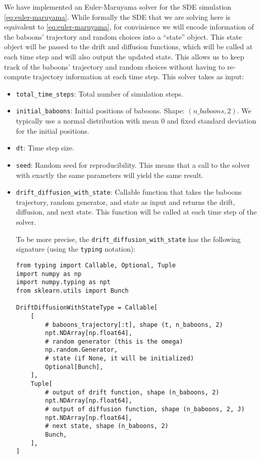 \documentclass[
    article,
    oneside,
]{memoir}
\begin{document}
We have implemented an Euler-Maruyama solver for the SDE simulation \eqref{eq:euler-maruyama}.
While formally the SDE that we are solving here is equivalent to \eqref{eq:euler-maruyama}, for convinience we will encode information of the baboons' trajectory and random choices into a ``state'' object. This state object will be passed to the drift and diffusion functions, which will be called at each time step and will also output the updated state. This allows us to keep
track of the baboons' trajectory and random choices without having to re-compute trajectory information at each time step.
This solver takes as input:
\begin{itemize}
    \item \texttt{total\_time\_steps}: Total number of simulation steps.
    
    \item \texttt{initial\_baboons}: Initial positions of baboons. Shape: $(n\_baboons, 2)$. We typically use a normal distribution with mean $0$ and fixed standard deviation for the initial positions.
    
    \item \texttt{dt}: Time step size.
    
    \item \texttt{seed}: Random seed for reproducibility. This means that a call to the solver with exactly the same parameters will yield the same result.
    
    \item \texttt{drift\_diffusion\_with\_state}: Callable function that takes the
        baboons trajectory, random generator, and state as input
        and returns the drift, diffusion, and next state. This function will be called at each time step of the solver.

To be more precise, the \texttt{drift\_diffusion\_with\_state} has the following signature (using the \texttt{typing} \cite{pythonTyping} notation):
\begin{verbatim}
from typing import Callable, Optional, Tuple
import numpy as np
import numpy.typing as npt
from sklearn.utils import Bunch

DriftDiffusionWithStateType = Callable[
    [
        # baboons_trajectory[:t], shape (t, n_baboons, 2)
        npt.NDArray[np.float64],
        # random generator (this is the omega)
        np.random.Generator,
        # state (if None, it will be initialized)
        Optional[Bunch],
    ],
    Tuple[
        # output of drift function, shape (n_baboons, 2)
        npt.NDArray[np.float64],
        # output of diffusion function, shape (n_baboons, 2, J)
        npt.NDArray[np.float64],
        # next state, shape (n_baboons, 2)
        Bunch,
    ],
]
\end{verbatim}
\end{itemize}
\end{document}
